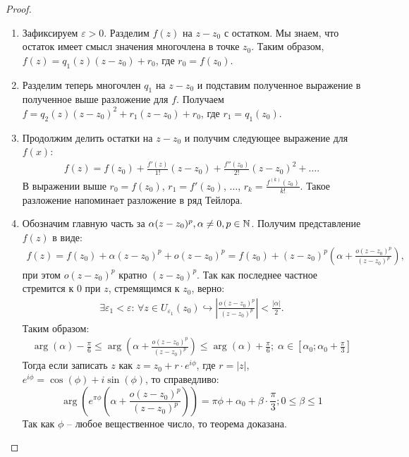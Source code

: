 \begin{proof}~
    \begin{enumerate}
        \item Зафиксируем $\varepsilon > 0$. Разделим $f(z)$ на $z - z_0$ с остатком. Мы знаем, 
        что остаток имеет смысл значения многочлена в точке $z_0$. Таким образом,
        $f(z) = q_1(z) (z-z_0) + r_0$, где $r_0 = f(z_0)$. 
        \item Разделим теперь многочлен $q_1$ на $z - z_0$ и подставим полученное выражение
        в полученное выше разложение для $f$. Получаем $f = q_2(z)(z-z_0)^2 + r_1(z-z_0) + r_0$, где $r_1 = q_1(z_0)$. 
        \item Продолжим делить остатки на $z-z_0$ и получим следующее выражение для $f(x)$:
        \begin{gather*}
            f(z) = f(z_0) + \frac{f'(z)}{1!}(z - z_0) + \frac{f''(z_0)}{2!}(z - z_0)^2 + \dots.
        \end{gather*}
        В выражении выше $r_0 = f(z_0)$, $r_1 = f'(z_0)$, $\dots$, $r_k = \frac {f^{(k)}(z_0)}{k!}$. 
        Такое разложение напоминает разложение в ряд Тейлора.
        \item 
        Обозначим главную часть за $\alpha (z - z_0)^p, \alpha \neq 0, p \in \mathbb{N}$. Получим представление 
        $f(z)$ в виде:
        \begin{gather*}
            f(z) = f(z_0) + \alpha (z-z_0)^p + o(z-z_0)^p = f(z_0) + (z - z_0)^p \left( \alpha + 
            \frac{o(z-z_0)^p}{(z-z_0)^p} \right),
        \end{gather*}
        при этом $o(z - z_0)^p $ кратно $(z - z_0)^p$. Так как последнее частное стремится 
        к 0 при $z$, стремящимся к $z_0$, верно:
        \begin{gather*}
            \exists \varepsilon_1 < \varepsilon: \, \forall z \in U_{\varepsilon_1}(z_0) \hookrightarrow 
            \left| \frac {o(z-z_0)^p}{(z-z_0)^p} \right| < \frac {|\alpha |}{2}. 
        \end{gather*}
        Таким образом:
        \begin{gather*}
            \arg(\alpha) - \frac {\pi}{6} \leq \arg(\alpha + \frac {o(z - z_0)^p}{(z - z_0)^p}) \leq 
            \arg(\alpha) + \frac {\pi}{6}; \; \alpha \in [\alpha_0; \alpha_0 + \frac {\pi}{3}]
        \end{gather*}
        Тогда если записать $z$ как $z = z_0 + r \cdot e^{i\phi}$, где $r = |z|$, $e^{i\phi} = \cos(\phi) + i\sin(\phi)$, то справедливо:
        $$\arg \left( e^{\pi\phi} \left( \alpha + \frac {o(z-z_0)^p}{(z-z_0)^p}\right) \right) = 
        \pi \phi + \alpha_0 + \beta \cdot \frac{\pi}{3}; 0 \leq \beta \leq 1$$
        Так как $\phi$ -- любое вещественное число, то теорема доказана.
    \end{enumerate}


\end{proof}
